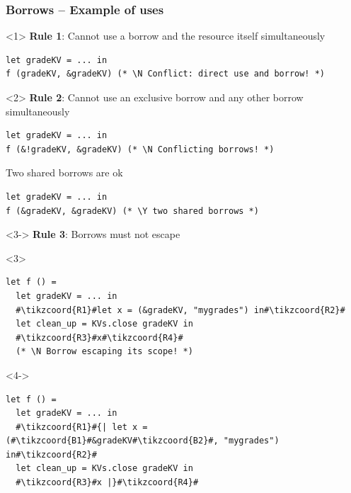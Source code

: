 \documentclass[aspectratio=169,dvipsnames,svgnames,10pt]{beamer}
\newcommand\Y{{\color{Green}{\ding{52}}}}
\newcommand\N{{\color{Red}{\ding{56}}}}
\begin{document}
\begin{frame}[fragile]
  \frametitle{Borrows -- Example of uses}

\begin{onlyenv}<1>
  \textbf{Rule 1}: Cannot use a borrow and the resource itself simultaneously
\begin{verbatim}
let gradeKV = ... in
f (gradeKV, &gradeKV) (* \N Conflict: direct use and borrow! *)
\end{verbatim}
\end{onlyenv}%
\begin{onlyenv}<2>
  \textbf{Rule 2}: Cannot use an exclusive borrow and any other borrow simultaneously
\begin{verbatim}
let gradeKV = ... in
f (&!gradeKV, &gradeKV) (* \N Conflicting borrows! *)
\end{verbatim}
  Two shared borrows are ok
\begin{verbatim}
let gradeKV = ... in
f (&gradeKV, &gradeKV) (* \Y two shared borrows *)
\end{verbatim}
\end{onlyenv}%
\begin{onlyenv}<3->
  \textbf{Rule 3}: Borrows must not escape
  \begin{onlyenv}<3>
\begin{verbatim}
let f () = 
  let gradeKV = ... in
  #\tikzcoord{R1}#let x = (&gradeKV, "mygrades") in#\tikzcoord{R2}#
  let clean_up = KVs.close gradeKV in
  #\tikzcoord{R3}#x#\tikzcoord{R4}#
  (* \N Borrow escaping its scope! *)
\end{verbatim}
  \end{onlyenv}
  \begin{onlyenv}<4->
\begin{verbatim}
let f () = 
  let gradeKV = ... in
  #\tikzcoord{R1}#{| let x = (#\tikzcoord{B1}#&gradeKV#\tikzcoord{B2}#, "mygrades") in#\tikzcoord{R2}#
  let clean_up = KVs.close gradeKV in
  #\tikzcoord{R3}#x |}#\tikzcoord{R4}#

\end{verbatim}
\end{onlyenv}
\end{onlyenv}
\end{frame}
\end{document}
